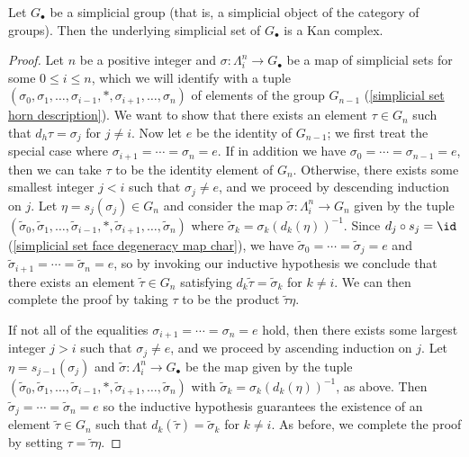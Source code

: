 \begin{proposition}\label{simplicial set group is Kan}
Let $G_\bullet$ be a simplicial group (that is, a simplicial object of the category of groups). Then the underlying simplicial set of $G_\bullet$ is a Kan complex.
\end{proposition}
\begin{proof}
Let $n$ be a positive integer and $\sigma:\Lambda^n_i\to G_\bullet$ be a map of simplicial sets for some $0\leq i\leq n$, which we will identify with a tuple $(\sigma_0,\sigma_1,\dots,\sigma_{i-1},\ast,\sigma_{i+1},\dots,\sigma_n)$ of elements of the group $G_{n-1}$ (\cref{simplicial set horn description}). We want to show that there exists an element $\tau\in G_n$ such that $d_h\tau=\sigma_j$ for $j\neq i$. Now let $e$ be the identity of $G_{n-1}$; we first treat the special case where $\sigma_{i+1}=\cdots=\sigma_n=e$. If in addition we have $\sigma_0=\cdots=\sigma_{n-1}=e$, then we can take $\tau$ to be the identity element of $G_n$. Otherwise, there exists some smallest integer $j<i$ such that $\sigma_j\neq e$, and we proceed by descending induction on $j$. Let $\eta=s_j(\sigma_j)\in G_n$ and consider the map $\tilde{\sigma}:\Lambda_i^n\to G_n$ given by the tuple $(\tilde{\sigma}_0,\tilde{\sigma}_1,\dots,\tilde{\sigma}_{i-1},\ast,\tilde{\sigma}_{i+1},\dots,\tilde{\sigma}_n)$ where $\tilde{\sigma}_k=\sigma_k(d_k(\eta))^{-1}$. Since $d_j\circ s_j=\id$ (\cref{simplicial set face degeneracy map char}), we have $\tilde{\sigma}_0=\cdots=\tilde{\sigma}_j=e$ and $\tilde{\sigma}_{i+1}=\cdots=\tilde{\sigma}_n=e$, so by invoking our inductive hypothesis we conclude that there exists an element $\tilde{\tau}\in G_n$ satisfying $d_k\tilde{\tau}=\tilde{\sigma}_k$ for $k\neq i$. We can then complete the proof by taking $\tau$ to be the product $\tilde{\tau}\eta$.\par
If not all of the equalities $\sigma_{i+1}=\cdots=\sigma_n=e$ hold, then there exists some largest integer $j>i$ such that $\sigma_j\neq e$, and we proceed by ascending induction on $j$. Let $\eta=s_{j-1}(\sigma_j)$ and $\tilde{\sigma}:\Lambda^n_i\to G_\bullet$ be the map given by the tuple $(\tilde{\sigma}_0,\tilde{\sigma}_1,\dots,\tilde{\sigma}_{i-1},\ast,\tilde{\sigma}_{i+1},\dots,\tilde{\sigma}_n)$ with $\tilde{\sigma}_k=\sigma_k(d_k(\eta))^{-1}$, as above. Then $\tilde{\sigma}_{j}=\cdots=\tilde{\sigma}_n=e$ so the inductive hypothesis guarantees the existence of an element $\tilde{\tau}\in G_n$ such that $d_k(\tilde{\tau})=\tilde{\sigma}_k$ for $k\neq i$. As before, we complete the proof by setting $\tau=\tilde{\tau}\eta$.
\end{proof}

